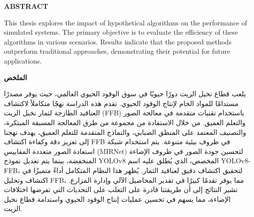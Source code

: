 \clearpage


\noindent
\begin{center}
    \vspace*{0mm} %
    {\fontsize{12pt}{14pt}\selectfont \textbf{ABSTRACT}}
\end{center}

\vspace{10mm} %

\noindent
This thesis explores the impact of hypothetical algorithms on the performance of simulated systems. The primary objective is to evaluate the efficiency of these algorithms in various scenarios. Results indicate that the proposed methods outperform traditional approaches, demonstrating their potential for future applications.

\clearpage



\noindent
\begin{center}
    \vspace*{0mm} %
    {\fontsize{12pt}{14pt}\selectfont \textbf{الملخص}}
\end{center}

\vspace{10mm} %

\noindent
يلعب قطاع نخيل الزيت دورًا حيويًا في سوق الوقود الحيوي العالمي، حيث يوفر مصدرًا مستدامًا للمواد الخام لإنتاج الوقود الحيوي. تقدم هذه الدراسة نهجًا متكاملاً لاكتشاف العناقيد الطازجة لثمار نخيل الزيت (FFB) باستخدام تقنيات متقدمة في معالجة الصور والتعلم العميق. من خلال الاستفادة من مجموعة من طرق المعالجة المسبقة المبتكرة، والتصنيف المعتمد على المنطق الضبابي، والنماذج المتقدمة للتعلم العميق، يهدف نهجنا إلى تعزيز دقة وكفاءة اكتشاف FFB في ظروف بيئية متنوعة. يتم استخدام شبكة استعادة الصور متعددة المقاييس (MIRNet) لتحسين جودة الصور في ظروف الإضاءة المنخفضة، بينما يتم تعديل نموذج YOLOv8 المخصص، الذي يُطلق عليه اسم YOLOv8-FFB، لتحقيق اكتشاف دقيق لعناقيد الثمار. يُظهر هذا النظام المتكامل أداءً متميزًا في اكتشاف وتحليل FFB، مما يوفر تقدمًا كبيرًا في تقدير المحاصيل الآلي وإدارة المزارع. تشير النتائج إلى أن طريقتنا قادرة على التغلب على التحديات التي تفرضها اختلافات الإضاءة، مما يسهم في تحسين عمليات إنتاج الوقود الحيوي واستدامة قطاع نخيل الزيت.

\clearpage